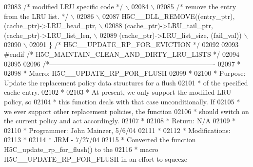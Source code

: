\begin{DoxyCode}
02083 \textcolor{preprocessor}{    }\textcolor{comment}{/* modified LRU specific code */}\textcolor{preprocessor}{                                         \(\backslash\)}
02084 \textcolor{preprocessor}{                                                                             \(\backslash\)}
02085 \textcolor{preprocessor}{    }\textcolor{comment}{/* remove the entry from the LRU list. */}\textcolor{preprocessor}{                                \(\backslash\)}
02086 \textcolor{preprocessor}{                                                                             \(\backslash\)}
02087 \textcolor{preprocessor}{    H5C\_\_DLL\_REMOVE((entry\_ptr), (cache\_ptr)->LRU\_head\_ptr,                  \(\backslash\)}
02088 \textcolor{preprocessor}{                    (cache\_ptr)->LRU\_tail\_ptr, (cache\_ptr)->LRU\_list\_len,    \(\backslash\)}
02089 \textcolor{preprocessor}{                    (cache\_ptr)->LRU\_list\_size, (fail\_val))                  \(\backslash\)}
02090 \textcolor{preprocessor}{                                                                             \(\backslash\)}
02091 \textcolor{preprocessor}{\} }\textcolor{comment}{/* H5C\_\_UPDATE\_RP\_FOR\_EVICTION */}\textcolor{preprocessor}{}
02092 
02093 \textcolor{preprocessor}{#endif }\textcolor{comment}{/* H5C\_MAINTAIN\_CLEAN\_AND\_DIRTY\_LRU\_LISTS */}\textcolor{preprocessor}{}
02094 
02095 
02096 \textcolor{comment}{/*-------------------------------------------------------------------------}
02097 \textcolor{comment}{ *}
02098 \textcolor{comment}{ * Macro:   H5C\_\_UPDATE\_RP\_FOR\_FLUSH}
02099 \textcolor{comment}{ *}
02100 \textcolor{comment}{ * Purpose:     Update the replacement policy data structures for a flush}
02101 \textcolor{comment}{ *      of the specified cache entry.}
02102 \textcolor{comment}{ *}
02103 \textcolor{comment}{ *      At present, we only support the modified LRU policy, so}
02104 \textcolor{comment}{ *      this function deals with that case unconditionally.  If}
02105 \textcolor{comment}{ *      we ever support other replacement policies, the function}
02106 \textcolor{comment}{ *      should switch on the current policy and act accordingly.}
02107 \textcolor{comment}{ *}
02108 \textcolor{comment}{ * Return:      N/A}
02109 \textcolor{comment}{ *}
02110 \textcolor{comment}{ * Programmer:  John Mainzer, 5/6/04}
02111 \textcolor{comment}{ *}
02112 \textcolor{comment}{ * Modifications:}
02113 \textcolor{comment}{ *}
02114 \textcolor{comment}{ *      JRM - 7/27/04}
02115 \textcolor{comment}{ *      Converted the function H5C\_update\_rp\_for\_flush() to the}
02116 \textcolor{comment}{ *      macro H5C\_\_UPDATE\_RP\_FOR\_FLUSH in an effort to squeeze}

\end{DoxyCode}
